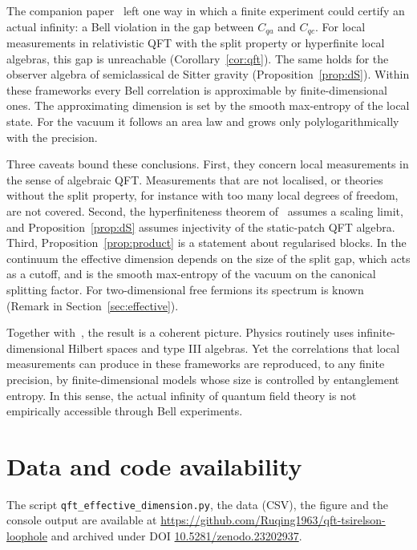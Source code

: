 \documentclass[11pt]{article}
\theoremstyle{definition}\newtheorem{definition}{Definition}[section]
\theoremstyle{remark}\newtheorem*{remark}{Remark}
\newcommand{\Cqa}{C_{qa}}
\newcommand{\Cqc}{C_{qc}}
\newcommand{\paperdoi}{10.5281/zenodo.23202937}
\begin{document}
The companion paper~\cite{Chen2026_certify} left one way in which a finite experiment could certify an actual infinity:
a Bell violation in the gap between $\Cqa$ and $\Cqc$. For local measurements in relativistic QFT with the split property
or hyperfinite local algebras, this gap is unreachable (Corollary~\ref{cor:qft}). The same holds for the observer
algebra of semiclassical de Sitter gravity (Proposition~\ref{prop:dS}). Within these frameworks every Bell correlation
is approximable by finite-dimensional ones. The approximating dimension is set by the smooth max-entropy of the local
state. For the vacuum it follows an area law and grows only polylogarithmically with the precision.

Three caveats bound these conclusions. First, they concern local measurements in the sense of algebraic QFT. Measurements
that are not localised, or theories without the split property, for instance with too many local degrees of freedom,
are not covered. Second, the hyperfiniteness theorem of~\cite{BDF} assumes a scaling limit, and Proposition~\ref{prop:dS}
assumes injectivity of the static-patch QFT algebra. Third, Proposition~\ref{prop:product} is a statement about regularised
blocks. In the continuum the effective dimension depends on the size of the split gap, which acts as a cutoff, and
is the smooth max-entropy of the vacuum on the canonical splitting factor. For two-dimensional free fermions its
spectrum is known~\cite{DuttaFaulknerLin} (Remark in Section~\ref{sec:effective}).

Together with~\cite{Chen2026_certify}, the result is a coherent picture. Physics routinely uses infinite-dimensional
Hilbert spaces and type III algebras. Yet the correlations that local measurements can produce in these frameworks
are reproduced, to any finite precision, by finite-dimensional models whose size is controlled by entanglement entropy.
In this sense, the actual infinity of quantum field theory is not empirically accessible through Bell experiments.

\section*{Data and code availability}
The script \texttt{qft\_effective\_dimension.py}, the data (CSV), the figure and the console output are available at
\url{https://github.com/Ruqing1963/qft-tsirelson-loophole} and archived under DOI \href{https://doi.org/\paperdoi}{\paperdoi}.
\end{document}
